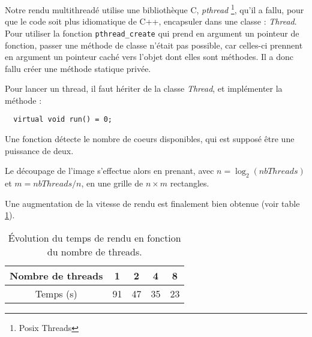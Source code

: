   Notre rendu multithreadé utilise une bibliothèque C, \emph{pthread} \footnote{Posix Threads}, qu'il a fallu, pour que le code soit plus idiomatique de C++, 
  encapsuler dans une classe : \emph{Thread}. Pour utiliser la fonction \verb|pthread_create| qui prend en argument un pointeur de fonction, passer une méthode de classe
  n'était pas possible, car celles-ci prennent en argument un pointeur caché vers l'objet dont elles sont méthodes. Il a donc fallu créer une méthode statique privée.
  
  Pour lancer un thread, il faut hériter de la classe \emph{Thread}, et implémenter la méthode :
  \begin{lstlisting}
  virtual void run() = 0;
  \end{lstlisting}
  
  Une fonction détecte le nombre de coeurs disponibles, qui est supposé être une puissance de deux.
  
  Le découpage de l'image s'effectue alors en prenant, avec $ n = \log_2(nbThreads) $ et $ m = nbThreads / n$, en une grille de $n \times m$ rectangles.
  
 Une augmentation de la vitesse de rendu est finalement bien obtenue (voir table \ref{tempsRendu}).
  
 \begin{table}
 \begin{center}
   \begin{tabular}{|c|c|c|c|c|}
  \hline 
  Nombre de threads & 1 & 2 & 4 & 8 \\ 
  \hline 
  Temps (s) & 91 & 47 & 35 & 23 \\ 
  \hline 
  \end{tabular}
 \end{center}
  \caption{Évolution du temps de rendu en fonction du nombre de threads.} \label{tempsRendu}
\end{table}  

 